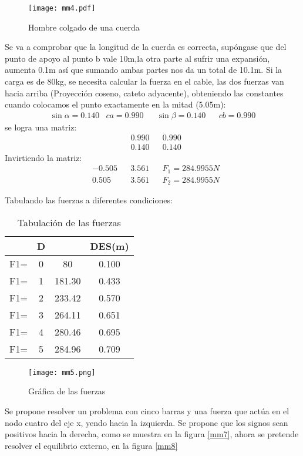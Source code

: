 \begin{figure}[h!]
\centering
  \texttt{[image: mm4.pdf]}
  \caption{Hombre colgado de una cuerda}
  \label{mm4}
\end{figure}

Se va a comprobar que la longitud de la cuerda es correcta, supóngase que del punto de apoyo al punto b vale 10m,la otra parte al sufrir una expansión, aumenta 0.1m así que sumando ambas partes nos da un total de 10.1m.
Si la carga es de 80kg, se necesita calcular la fuerza en el cable, las dos fuerzas van hacia arriba (Proyección coseno, cateto adyacente), obteniendo las constantes cuando colocamos el punto exactamente en la mitad (5.05m):
\begin{align*}
    \sin{\alpha} = 0.140 & ca = 0.990&&\sin{\beta} = 0.140&& cb = 0.990
\end{align*}
se logra una matriz:
\begin{align*}
    &0.990&&0.990\\
    &0.140&&0.140
\end{align*}
Invirtiendo la matriz:
\begin{align*}
    &-0.505&&3.561&&F_1= 284.9955N\\
    &0.505&&3.561&&F_{2} = 284.9955N
\end{align*}

Tabulando las fuerzas a diferentes condiciones:
\begin{table}[h!]
  \centering
    \begin{tabular}{@{}cccc@{}}
    \toprule
        & D &        & DES(m) \\ \midrule
    F1= & 0 & 80     & 0.100  \\
    F1= & 1 & 181.30 & 0.433  \\
    F1= & 2 & 233.42 & 0.570  \\
    F1= & 3 & 264.11 & 0.651  \\
    F1= & 4 & 280.46 & 0.695  \\
    F1= & 5 & 284.96 & 0.709  \\ \bottomrule
    \end{tabular}
    \caption{Tabulación de las fuerzas}
    \label{tabmm2}
\end{table}

\begin{figure}[h!]
\centering
  \texttt{[image: mm5.png]}
  \caption{Gráfica de las fuerzas}
  \label{mm5}
\end{figure}

Se propone resolver un problema con cinco barras y una fuerza que actúa en el nodo cuatro del eje x, yendo hacia la izquierda.
Se propone que los signos sean positivos hacia la derecha, como se muestra en la figura \ref{mm7}, ahora se pretende resolver el equilibrio externo, en la figura \ref{mm8}


